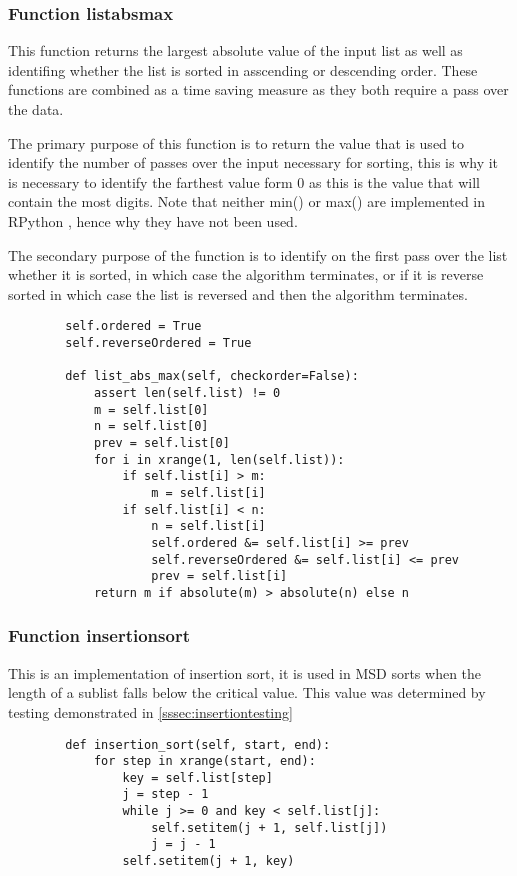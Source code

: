 \documentclass[12pt]{article}
\begin{document}
\subsubsection{Function list\textunderscore abs\textunderscore max}
This function returns the largest absolute value of the input list as well as identifing whether the list is sorted in asscending or descending order. These functions are combined as a time saving measure as they both require a pass over the data.
\par
The primary purpose of this function is to return the value that is used to identify the number of passes over the input necessary for sorting, this is why it is necessary to identify the farthest value form 0 as this is the value that will contain the most digits. Note that neither min() or max() are implemented in RPython \cite{rpythonobj}, hence why they have not been used.
\par
The secondary purpose of the function is to identify on the first pass over the list whether it is sorted, in which case the algorithm terminates, or if it is reverse sorted in which case the list is reversed and then the algorithm terminates.
\begin{lstlisting}
        self.ordered = True
        self.reverseOrdered = True

        def list_abs_max(self, checkorder=False):
            assert len(self.list) != 0
            m = self.list[0]
            n = self.list[0]
            prev = self.list[0]
            for i in xrange(1, len(self.list)):
                if self.list[i] > m:
                    m = self.list[i]
                if self.list[i] < n:
                    n = self.list[i]
					self.ordered &= self.list[i] >= prev
					self.reverseOrdered &= self.list[i] <= prev
					prev = self.list[i]
            return m if absolute(m) > absolute(n) else n
      \end{lstlisting}
\pagebreak
\subsubsection{Function insertion\textunderscore sort}
This is an implementation of insertion sort, it is used in MSD sorts when the length of a sublist falls below the critical value. This value was determined by testing demonstrated in \ref{sssec:insertiontesting}
\begin{lstlisting}
        def insertion_sort(self, start, end):
            for step in xrange(start, end):
                key = self.list[step]
                j = step - 1
                while j >= 0 and key < self.list[j]:
                    self.setitem(j + 1, self.list[j])
                    j = j - 1
                self.setitem(j + 1, key)
      \end{lstlisting}
\end{document}
